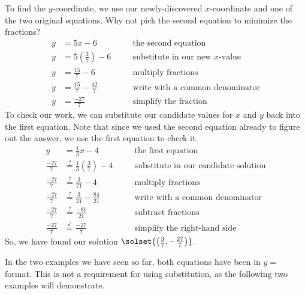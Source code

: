 To find the $y$-coordinate, we use our newly-discovered $x$-coordinate and one of the two original equations. Why not pick the second equation to minimize the fractions?
\[\begin{aligned}
y &= 5x - 6
&& \quad\text{the second equation}\\[1ex]
y &= 5\left(\frac{3}{7}\right)-6
&& \quad\text{substitute in our new $x$-value}\\[1ex]
y &= \frac{15}{7} - 6
&& \quad\text{multiply fractions}\\[1ex]
y &= \frac{15}{7}-\frac{42}{7}
&& \quad\text{write with a common denominator}\\[1ex]
y &= \frac{-27}{7}
&& \quad\text{simplify the fraction}
\end{aligned}\]
To check our work, we can substitute our candidate values for $x$ and $y$ back into the first equation. Note that since we used the second equation already to figure out the answer, we use the first equation to check it.
\[\begin{aligned}
y &= \frac{1}{3}x - 4
&& \quad\text{the first equation}\\[1ex]
\frac{-27}{7} &\overset{?}{=} \frac{1}{3}\left(\frac{3}{7}\right)-4
&& \quad\text{substitute in our candidate solution}\\[1ex]
\frac{-27}{7} &\overset{?}{=} \frac{3}{21}-4
&& \quad\text{multiply fractions}\\[1ex]
\frac{-27}{7} &\overset{?}{=} \frac{3}{21}-\frac{84}{21}
&& \quad\text{write with a common denominator}\\[1ex]
\frac{-27}{7} &\overset{?}{=} \frac{-81}{21}
&& \quad\text{subtract fractions}\\[1ex]
\frac{-27}{7} &\overset{\checkmark}{=} \frac{-27}{7}
&& \quad\text{simplify the right-hand side}
\end{aligned}\]
So, we have found our solution $\solset{\left(\frac{3}{7}, -\frac{27}{7}\right)}$.

In the two examples we have seen so far, both equations have been in $y=$ format. This is not a requirement for using substitution, as the following two examples will demonstrate.

